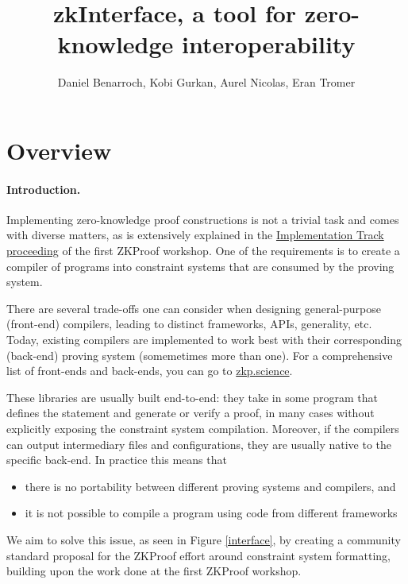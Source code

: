 \documentclass[a4paper,11pt]{article}
\title{zkInterface, a tool for zero-knowledge interoperability}
\author{Daniel Benarroch, Kobi Gurkan, Aurel Nicolas, Eran Tromer}
\begin{document}
		
		\maketitle
		

		\section{Overview}
		\paragraph{Introduction.} Implementing zero-knowledge proof constructions is not a trivial task and comes with diverse matters, as is extensively explained in the \href{https://zkproof.org/proceedings-snapshots/zkproof-implementation-20180801.pdf}{Implementation Track proceeding} of the first ZKProof workshop. One of the requirements is to create a compiler of programs into constraint systems that are consumed by the proving system.
		
		There are several trade-offs one can consider when designing general-purpose (front-end) compilers, leading to distinct frameworks, APIs, generality, etc. Today, existing compilers are implemented to work best with their corresponding (back-end) proving system (somemetimes more than one). For a comprehensive list of front-ends and back-ends, you can go to \href{https://zkp.science}{zkp.science}. 
		
		These libraries are usually built end-to-end: they take in some program that defines the statement and generate or verify a proof, in many cases without explicitly exposing the constraint system compilation. Moreover, if the compilers can output intermediary files and configurations, they are usually native to the specific back-end. In practice this means that
		\begin{itemize}
			\item there is no portability between different proving systems and compilers, and
			\item it is not possible to compile a program using code from different frameworks
		\end{itemize}   
		
		We aim to solve this issue, as seen in Figure \ref{interface}, by creating a community standard proposal for the ZKProof effort around constraint system formatting, building upon the work done at the first ZKProof workshop.
		
\end{document}
